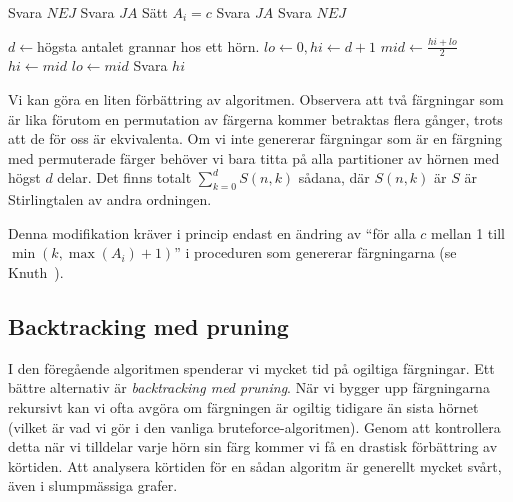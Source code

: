 \documentclass[a4paper]{report}
\begin{document}
\clearpage

\begin{algorithmic}[1]
                    \State Svara $NEJ$
                \EndIf
            \EndFor
            \State Svara $JA$
        \EndIf
            \State Sätt $A_i = c$
                \State Svara $JA$
            \EndIf
        \EndFor
        \State Svara $NEJ$
    \EndProcedure

        \State $d \gets $högsta antalet grannar hos ett hörn.
        \State $lo \gets 0, hi \gets d+1$
            \State $mid \gets \frac{hi + lo}{2}$
                \State $hi \gets mid$
            \Else
                \State $lo \gets mid$
            \EndIf
        \EndWhile
        \State Svara $hi$
    \EndProcedure
\end{algorithmic}

Vi kan göra en liten förbättring av algoritmen. Observera att två färgningar som är lika förutom en permutation av färgerna kommer betraktas flera gånger, trots att de för oss är ekvivalenta. Om vi inte genererar färgningar som är en färgning med permuterade färger behöver vi bara titta på alla partitioner av hörnen med högst $d$ delar. Det finns totalt $\sum_{k=0}^d{S(n, k)}$ sådana, där $S(n, k)$ är $S$ är Stirlingtalen av andra ordningen.

Denna modifikation kräver i princip endast en ändring av ``för alla $c$ mellan 1 till $\min(k, \max(A_i) + 1)$'' i proceduren som genererar färgningarna (se Knuth~\cite{Knuth4a:1997}).

\subsection{Backtracking med pruning}
I den föregående algoritmen spenderar vi mycket tid på ogiltiga färgningar. Ett bättre alternativ är \emph{backtracking med pruning}. När vi bygger upp färgningarna rekursivt kan vi ofta avgöra om färgningen är ogiltig tidigare än sista hörnet (vilket är vad vi gör i den vanliga bruteforce-algoritmen).
Genom att kontrollera detta när vi tilldelar varje hörn sin färg kommer vi få en drastisk förbättring av körtiden. Att analysera körtiden för en sådan algoritm är generellt mycket svårt, även i slumpmässiga grafer.
\end{document}
